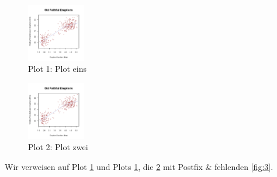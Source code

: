\begin{figure}
\centering
\includegraphics[width=1in,height=\textheight]{img/fig-1.png}
\caption{Plot 1: Plot eins}\label{fig:1}
\end{figure}

\begin{figure}
\centering
\includegraphics[width=1in,height=\textheight]{img/fig-1.png}
\caption{Plot 2: Plot zwei}\label{fig:2}
\end{figure}

Wir verweisen auf Plot \ref{fig:1} und Plots \ref{fig:1}, die
\ref{fig:2} mit Postfix \& fehlenden \ref{fig:3}.
